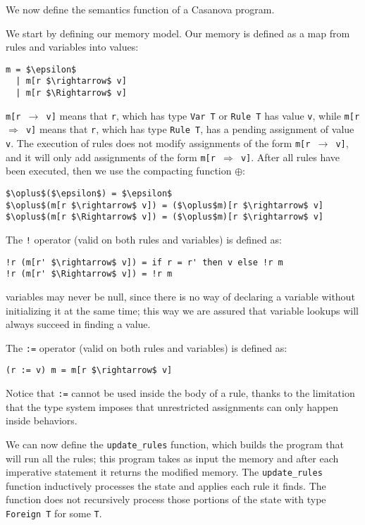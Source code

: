 We now define the semantics function of a Casanova program.

We start by defining our memory model. Our memory is defined as a map from rules and variables into values:

\begin{lstlisting}
m = $\epsilon$
  | m[r $\rightarrow$ v]
  | m[r $\Rightarrow$ v]
\end{lstlisting}

\texttt{m[r $\rightarrow$ v]} means that \texttt{r}, which has type \texttt{Var T} or \texttt{Rule T} has value \texttt{v}, while \texttt{m[r $\Rightarrow$ v]} means that \texttt{r}, which has type \texttt{Rule T}, has a pending assignment of value \texttt{v}. The execution of rules does not modify assignments of the form \texttt{m[r $\rightarrow$ v]}, and it will only add assignments of the form \texttt{m[r $\Rightarrow$ v]}. After all rules have been executed, then we use the compacting function $\oplus$:

\begin{lstlisting}
$\oplus$($\epsilon$) = $\epsilon$
$\oplus$(m[r $\rightarrow$ v]) = ($\oplus$m)[r $\rightarrow$ v]
$\oplus$(m[r $\Rightarrow$ v]) = ($\oplus$m)[r $\rightarrow$ v]
\end{lstlisting}

The \texttt{!} operator (valid on both rules and variables) is defined as:

\begin{lstlisting}
!r (m[r' $\rightarrow$ v]) = if r = r' then v else !r m
!r (m[r' $\Rightarrow$ v]) = !r m
\end{lstlisting}

variables may never be null, since there is no way of declaring a variable without initializing it at the same time; this way we are assured that variable lookups will always succeed in finding a value.

The \texttt{:=} operator (valid on both rules and variables) is defined as:

\begin{lstlisting}
(r := v) m = m[r $\rightarrow$ v]
\end{lstlisting}

Notice that \texttt{:=} cannot be used inside the body of a rule, thanks to the limitation that the type system imposes that unrestricted assignments can only happen inside behaviors.

We can now define the \texttt{update\_rules} function, which builds the program that will run all the rules; this program takes as input the memory and after each imperative statement it returns the modified memory. The \texttt{update\_rules} function inductively processes the state and applies each rule it finds. The function does not recursively process those portions of the state with type \texttt{Foreign T} for some \texttt{T}.

